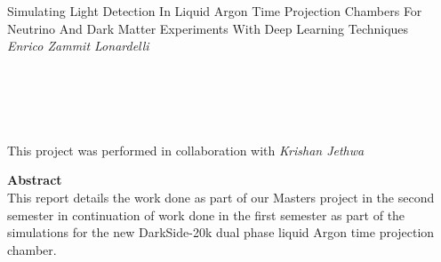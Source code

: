 \documentclass[11pt]{article} %
\begin{document}



\begin{center} %

{\Huge Simulating Light Detection In Liquid Argon Time Projection Chambers For Neutrino
And Dark Matter Experiments With Deep Learning Techniques}\\[0.5cm] %
\vspace{5mm}
\textit{Enrico Zammit Lonardelli}
\\
\vspace{5mm}
\\
\vspace{5mm}
\\
\vspace{5mm}
\\
\vspace{5mm}
\\
\vspace{5mm}
\\
\vspace{5mm}
This project was performed in collaboration with \textit{Krishan Jethwa}\\[0.3cm] %

\end{center}
\vspace{60mm}
{\Large \textbf{Abstract}}
\vspace{2mm}
\\
This report details the work done as part of our Masters project in the second semester in continuation of work done in the first semester \cite{firstsemester}
as part of the simulations for the new DarkSide-20k dual phase liquid Argon time projection chamber.
\end{document}
